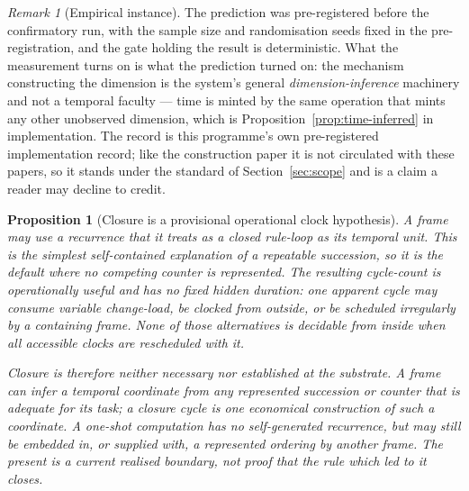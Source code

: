 \documentclass[11pt,a4paper]{article}
\newtheorem{proposition}[definition]{Proposition}
\theoremstyle{remark}\newtheorem{remark}[definition]{Remark}
\begin{document}
\begin{remark}[Empirical instance]
The prediction was pre-registered before the confirmatory run, with the sample size and randomisation seeds fixed in the pre-registration, and the gate holding the result is deterministic. What the measurement turns on is what the prediction turned on: the mechanism constructing the dimension is the system's general \emph{dimension-inference} machinery and not a temporal faculty --- time is minted by the same operation that mints any other unobserved dimension, which is Proposition~\ref{prop:time-inferred} in implementation. The record is this programme's own pre-registered implementation record; like the construction paper it is not circulated with these papers, so it stands under the standard of Section~\ref{sec:scope} and is a claim a reader may decline to credit.
\end{remark}

\begin{proposition}[Closure is a provisional operational clock hypothesis]\label{prop:cycle-unit}
A frame may use a recurrence that it treats as a closed rule-loop as its temporal unit. This is the
simplest self-contained explanation of a repeatable succession, so it is the default where no
competing counter is represented. The resulting cycle-count is operationally useful and has no fixed
hidden duration: one apparent cycle may consume variable change-load, be clocked from outside, or be
scheduled irregularly by a containing frame. None of those alternatives is decidable from inside when
all accessible clocks are rescheduled with it.

Closure is therefore neither necessary nor established at the substrate. A frame can infer a temporal
coordinate from any represented succession or counter that is adequate for its task; a closure cycle
is one economical construction of such a coordinate. A one-shot computation has no \emph{self-generated}
recurrence, but may still be embedded in, or supplied with, a represented ordering by another frame.
The present is a current realised boundary, not proof that the rule which led to it closes.
\end{proposition}
\end{document}
